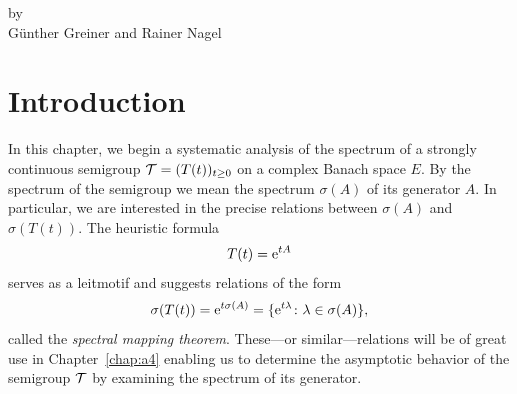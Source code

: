 \label{chap:a3}%
\pagestyle{headings}
\thispagestyle{empty}
{\Large
\vspace*{-.75cm}
by \\[.25em]
Günther Greiner and Rainer Nagel 
\vspace{.75cm}
\\
}
\section{Introduction}\label{sec:a3-1}%
In this chapter, we begin a systematic analysis of the spectrum of a strongly continuous semigroup $\TT = (T(t))_{t\geq 0}$ on a complex Banach space $E$.
By the spectrum of the semigroup we mean the spectrum $\sigma(A)$ of its generator $A$.
In particular, we are interested in the precise relations between $\sigma(A)$ and $\sigma(T(t))$.
The heuristic formula
\[
	T(t) = \mathrm{e}^{tA}
\]
serves as a leitmotif and suggests relations of the form
\[
\sigma(T(t)) = \mathrm{e}^{t\sigma(A)} = \{ \mathrm{e}^{t\lambda} \colon \lambda \in \sigma
(A) \} ,
\]
called the \emph{spectral mapping theorem}.
These---or similar---relations will be of great use in Chapter~\ref{chap:a4} enabling us to determine the asymptotic behavior of the semigroup $\mathcal{T}$ by examining the spectrum of its generator.

